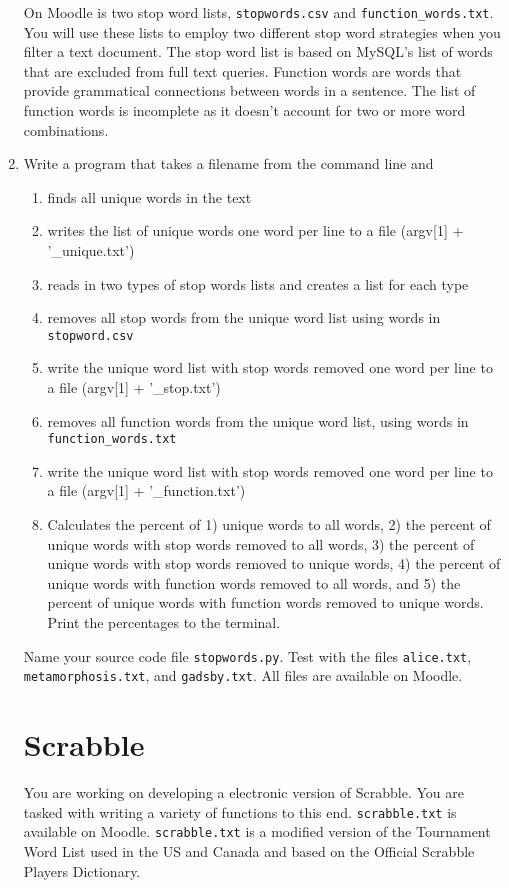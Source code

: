 \documentclass[12pt]{article}
\begin{document}
\begin{enumerate}
On Moodle is two stop word lists, \texttt{stopwords.csv} and \texttt{function\_words.txt}. You will use these lists to employ two different stop word strategies when you filter a text document. The stop word list is based on MySQL's list of words that are excluded from full text queries. Function words are words that provide grammatical connections between words in a sentence. The list of function words is incomplete as it doesn't account for two or more word combinations. 

\item Write a program that takes a filename from the command line and 
  \begin{enumerate}
\item finds all unique words in the text
\item writes the list of unique words one word per line to a file (argv[1] + '\_unique.txt')
\item reads in two types of stop words lists and creates a list for each type
\item removes all stop words from the unique word list using words in \texttt{stopword.csv}
\item write the unique word list with stop words removed one word per line to a file (argv[1] + '\_stop.txt')
\item removes all function words from the unique word list, using words in \texttt{function\_words.txt}
\item write the unique word list with stop words removed one word per line to a file (argv[1] + '\_function.txt')
\item Calculates the percent of 1) unique words to all words, 2) the percent of unique words with stop words removed to all words, 3) the percent of unique words with stop words removed to unique words, 4) the percent of unique words with function words removed to all words, and 5) the percent of unique words with function words removed to unique words. Print the percentages to the terminal. 
\end{enumerate}

Name your source code file \texttt{stopwords.py}. Test with the files \texttt{alice.txt}, \texttt{metamorphosis.txt}, and \texttt{gadsby.txt}. All files are available on Moodle.

\section*{Scrabble}

You are working on developing a electronic version of Scrabble. You are tasked with writing a variety of functions to this end. \texttt{scrabble.txt} is available on Moodle. \texttt{scrabble.txt} is a modified version of the Tournament Word List used in the US and Canada and based on the Official Scrabble Players Dictionary.


\end{enumerate}
\end{document}
